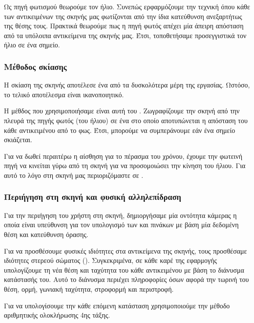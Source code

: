 \documentclass[11pt]{scrartcl} %
\begin{document}
Ως πηγή φωτισμού θεωρούμε τον ήλιο. Συνεπώς ερφαρμόζουμε την τεχνική  όπου 
κάθε  των αντικειμένων της σκηνής μας φωτίζονται από την ίδια κατεύθυνση ανεξαρτήτως της θέσης τους.
Πρακτικά θεωρούμε πως η πηγή φωτός απέχει μία άπειρη απόσταση από τα υπόλοιπα αντικείμενα της σκηνής μας.
Έτσι, τοποθετήσαμε προσεγγιστικά τον ήλιο σε ένα  σημείο. 


\subsubsection{Μέθοδος σκίασης}

Η σκίαση της σκηνής αποτέλεσε ένα από τα δυσκολότερα μέρη της εργασίας. Ωστόσο, το τελικό αποτέλεσμα 
είναι ικανοποιητικό. 

Η μέθδος που χρησιμοποιήσαμε είναι αυτή του . Ζωγραφίζουμε την σκηνή από την πλευρά 
της πηγής φωτός (του ήλιου) σε ένα  στο οποίο αποτυπώνεται η απόσταση του κάθε αντικειμένου 
από το φως. Έτσι, μπορούμε να συμπεράνουμε εάν ένα σημείο σκιάζεται. 

Για να δωθεί περαιτέρω η αίσθηση για το πέρασμα του χρόνου, έχουμε την φωτεινή πηγή να κινείται 
γύρω από τη σκηνή για να προσομοιώσει την κίνηση του ήλιου. 
Για αυτό το λόγο στη σκηνή μας περιοριζόμαστε σε .


\subsubsection{Περιήγηση στη σκηνή και φυσική αλληλεπίδραση}

Για την περιήγηση του χρήστη στη σκηνή, δημιοργήσαμε μία οντότητα κάμερας η οποία είναι υπεύθυνση 
για τον υπολογισμό των  και  πινάκων με βάση μία δεδομένη θέση και κατεύθυνση όρασης.

Για να προσθέσουμε φυσικές ιδιότητες στα αντικείμενα της σκηνής, τους προσθέσαμε ιδιότητες στερεού σώματος ().
Συγκεκριμένα, σε κάθε καρέ της εφαρμογής υπολογίζουμε τη νέα θέση και ταχύτητα του κάθε αντικειμένου με βάση το διάνυσμα κατάστασής 
του. Αυτό το διάνυσμα περιέχει πληροφορίες όσων αφορά την τωρινή του θέση, ορμή, γωνιακή ταχύτητα, στροφορμή και περιστροφή.

Για να υπολογίσουμε την κάθε επόμενη κατάσταση χρησιμοποιούμε την μέθοδο αριθμητικής ολοκλήρωσης  4ης τάξης.
\end{document}
